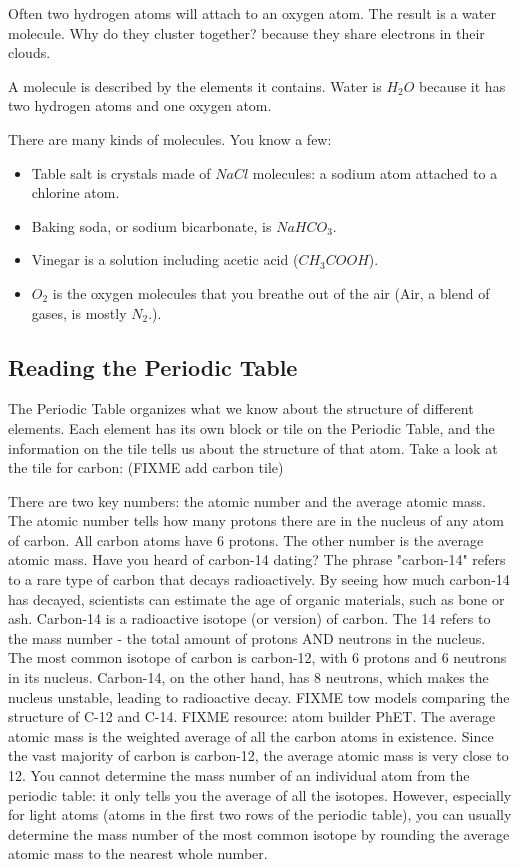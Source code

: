 Often two hydrogen atoms will attach to an oxygen atom. The result is
a water molecule. Why do they cluster together? because they share 
electrons in their clouds.

A molecule is described by the elements it contains. Water is $H_2O$
because it has two hydrogen atoms and one oxygen atom.

There are many kinds of molecules. You know a few:
\begin{itemize}
\item Table salt is crystals made of $NaCl$ molecules: a sodium atom attached to a chlorine atom.
\item Baking soda, or sodium bicarbonate, is $NaHCO_3$.
\item Vinegar is a solution including acetic acid ($CH_3COOH$).
\item $O_2$ is the oxygen molecules that you breathe out of the air (Air, a blend of gases, is mostly $N_2$.).
\end{itemize}

\subsection{Reading the Periodic Table}
The Periodic Table organizes what we know about the structure of different 
elements. Each element has its own block or tile on the Periodic Table, and the 
information on the tile tells us about the structure of that atom. Take a look at 
the tile for carbon: (FIXME add carbon tile)

There are two key numbers: the atomic number and the average atomic mass. The 
atomic number tells how many protons there are in the nucleus of any atom of 
carbon. All carbon atoms have 6 protons. The other number is the average atomic 
mass. Have you heard of carbon-14 dating? The phrase "carbon-14" refers to a rare 
type of carbon that decays radioactively. By seeing how much carbon-14 has 
decayed, scientists can estimate the age of organic materials, such as bone or 
ash. Carbon-14 is a radioactive isotope (or version) of carbon. The 14 refers to 
the mass number - the total amount of protons AND neutrons in the nucleus. The 
most common isotope of carbon is carbon-12, with 6 protons and 6 neutrons in its 
nucleus. Carbon-14, on the other hand, has 8 neutrons, which makes the nucleus 
unstable, leading to radioactive decay. FIXME tow models comparing the structure 
of  C-12 and C-14. FIXME resource: atom builder PhET. The average atomic mass is 
the weighted average of all the carbon atoms in existence. Since the vast 
majority of carbon is carbon-12, the average atomic mass is very close to 12. You 
cannot determine the mass number of an individual atom from the periodic table: 
it only tells you the average of all the isotopes. However, especially for light 
atoms (atoms in the first two rows of the periodic table), you can usually 
determine the mass number of the most common isotope by rounding the average 
atomic mass to the nearest whole number. 

